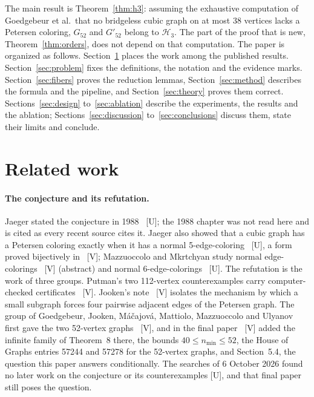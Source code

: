 \documentclass[11pt]{article}
\theoremstyle{definition}
\theoremstyle{remark}
\newcommand{\Hthree}{\mathcal{H}_3}
\newcommand{\Ga}{G_{52}}
\newcommand{\Gb}{G'_{52}}
\newcommand{\evV}{\textnormal{[V]}}
\newcommand{\evU}{\textnormal{[U]}}
\begin{document}
The main result is Theorem~\ref{thm:h3}: assuming the exhaustive computation of
Goedgebeur et al.\ that no bridgeless cubic graph on at most 38 vertices lacks a Petersen coloring,
$\Ga$ and $\Gb$ belong to $\Hthree$. The part of the proof that is new, Theorem~\ref{thm:orders}, does not
depend on that computation. The paper is organized as follows. Section~\ref{sec:related} places the work
among the published results. Section~\ref{sec:problem} fixes the definitions, the notation and the evidence
marks. Section~\ref{sec:fibers} proves the reduction lemmas, Section~\ref{sec:method} describes the formula
and the pipeline, and Section~\ref{sec:theory} proves them correct. Sections~\ref{sec:design} to~\ref{sec:ablation}
describe the experiments, the results and the ablation; Sections~\ref{sec:discussion} to~\ref{sec:conclusions} discuss
them, state their limits and conclude.

\section{Related work}\label{sec:related}

\paragraph{The conjecture and its refutation.} Jaeger stated the conjecture in 1988~\cite{Jaeger1988}
\evU{}; the 1988 chapter was not read here and is cited as every recent source cites it. Jaeger also showed
that a cubic graph has a Petersen coloring exactly when it has a normal 5-edge-coloring~\cite{Jaeger1985}
\evU{}, a form proved bijectively in~\cite[Proposition~2.1]{Putman2026} \evV{}; Mazzuoccolo and
Mkrtchyan study normal edge-colorings~\cite{MazzuoccoloMkrtchyan2020} \evV{} (abstract) and normal
6-edge-colorings~\cite{MazzuoccoloMkrtchyan2020b} \evU{}. The refutation is the work of three groups.
Putman's two 112-vertex counterexamples carry computer-checked certificates~\cite{Putman2026}
\evV{}. Jooken's note~\cite{Jooken2026} \evV{} isolates the mechanism by which a small subgraph forces four
pairwise adjacent edges of the Petersen graph. The group of Goedgebeur, Jooken, M\'a\v{c}ajov\'a,
Mattiolo, Mazzuoccolo and Ulyanov first gave the two 52-vertex graphs~\cite{GJMMM2026zenodo} \evV{}, and in the
final paper~\cite{GJMMMU2026} \evV{} added the infinite family of Theorem~8 there, the bounds
$40 \le n_{\min} \le 52$, the House of Graphs entries 57244 and 57278 for the 52-vertex graphs, and Section~5.4, the question this paper answers conditionally. The searches of 6 October 2026
found no later work on the conjecture or its counterexamples \evU{}, and that final paper still poses the question.
\end{document}
